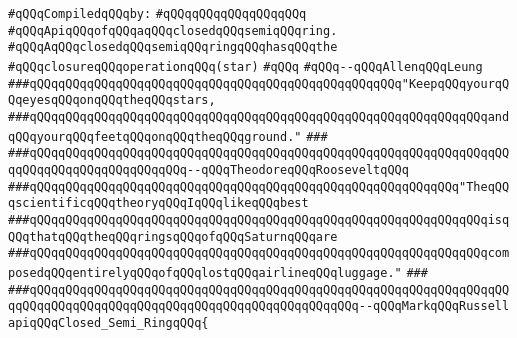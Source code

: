 \label{src/lib/graph/closed-semi-ring.api}
\newline
\verb|#qQQqCompiledqQQqby:|\newline
\verb|#qQQqqQQqqQQqqQQqqQQq|\newline
\newline
\verb|#qQQqApiqQQqofqQQqaqQQqclosedqQQqsemiqQQqring.|\newline
\verb|#qQQqAqQQqclosedqQQqsemiqQQqringqQQqhasqQQqthe|\newline
\verb|#qQQqclosureqQQqoperationqQQq(star)|\newline
\verb|#qQQq|\newline
\verb|#qQQq--qQQqAllenqQQqLeung|\newline
\newline
\newline
\newline
\verb|###qQQqqQQqqQQqqQQqqQQqqQQqqQQqqQQqqQQqqQQqqQQqqQQqqQQq"KeepqQQqyourqQQqeyesqQQqonqQQqtheqQQqstars,|\newline
\verb|###qQQqqQQqqQQqqQQqqQQqqQQqqQQqqQQqqQQqqQQqqQQqqQQqqQQqqQQqqQQqqQQqandqQQqyourqQQqfeetqQQqonqQQqtheqQQqground."|\newline
\verb|###|\newline
\verb|###qQQqqQQqqQQqqQQqqQQqqQQqqQQqqQQqqQQqqQQqqQQqqQQqqQQqqQQqqQQqqQQqqQQqqQQqqQQqqQQqqQQqqQQqqQQq--qQQqTheodoreqQQqRooseveltqQQq|\newline
\newline
\newline
\newline
\verb|###qQQqqQQqqQQqqQQqqQQqqQQqqQQqqQQqqQQqqQQqqQQqqQQqqQQqqQQqqQQq"TheqQQqscientificqQQqtheoryqQQqIqQQqlikeqQQqbest|\newline
\verb|###qQQqqQQqqQQqqQQqqQQqqQQqqQQqqQQqqQQqqQQqqQQqqQQqqQQqqQQqqQQqqQQqisqQQqthatqQQqtheqQQqringsqQQqofqQQqSaturnqQQqare|\newline
\verb|###qQQqqQQqqQQqqQQqqQQqqQQqqQQqqQQqqQQqqQQqqQQqqQQqqQQqqQQqqQQqqQQqcomposedqQQqentirelyqQQqofqQQqlostqQQqairlineqQQqluggage."|\newline
\verb|###|\newline
\verb|###qQQqqQQqqQQqqQQqqQQqqQQqqQQqqQQqqQQqqQQqqQQqqQQqqQQqqQQqqQQqqQQqqQQqqQQqqQQqqQQqqQQqqQQqqQQqqQQqqQQqqQQqqQQqqQQqqQQq--qQQqMarkqQQqRussell|\newline
\newline
\newline
\newline
\verb|apiqQQqClosed_Semi_RingqQQq{|\newline

